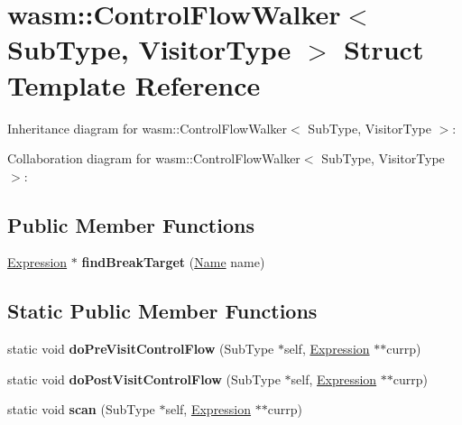 \hypertarget{structwasm_1_1_control_flow_walker}{}\section{wasm\+:\+:Control\+Flow\+Walker$<$ Sub\+Type, Visitor\+Type $>$ Struct Template Reference}
\label{structwasm_1_1_control_flow_walker}


Inheritance diagram for wasm\+:\+:Control\+Flow\+Walker$<$ Sub\+Type, Visitor\+Type $>$\+:


Collaboration diagram for wasm\+:\+:Control\+Flow\+Walker$<$ Sub\+Type, Visitor\+Type $>$\+:
\subsection*{Public Member Functions}
\begin{DoxyCompactItemize}
\item 
\mbox{\label{structwasm_1_1_control_flow_walker_a021bdfacdf154e3b8c450785f9c20e19}} 
\mbox{\hyperlink{classwasm_1_1_expression}{Expression}} $\ast$ {\bfseries find\+Break\+Target} (\mbox{\hyperlink{structwasm_1_1_name}{Name}} name)
\end{DoxyCompactItemize}
\subsection*{Static Public Member Functions}
\begin{DoxyCompactItemize}
\item 
\mbox{\label{structwasm_1_1_control_flow_walker_a732edfd6279e2cffbf8198e6515a9536}} 
static void {\bfseries do\+Pre\+Visit\+Control\+Flow} (Sub\+Type $\ast$self, \mbox{\hyperlink{classwasm_1_1_expression}{Expression}} $\ast$$\ast$currp)
\item 
\mbox{\label{structwasm_1_1_control_flow_walker_aae7ba01d9d60df38ce5e92864a6988a9}} 
static void {\bfseries do\+Post\+Visit\+Control\+Flow} (Sub\+Type $\ast$self, \mbox{\hyperlink{classwasm_1_1_expression}{Expression}} $\ast$$\ast$currp)
\item 
\mbox{\label{structwasm_1_1_control_flow_walker_a3bc223af18448465e087a5e8d47409f7}} 
static void {\bfseries scan} (Sub\+Type $\ast$self, \mbox{\hyperlink{classwasm_1_1_expression}{Expression}} $\ast$$\ast$currp)
\end{DoxyCompactItemize}
